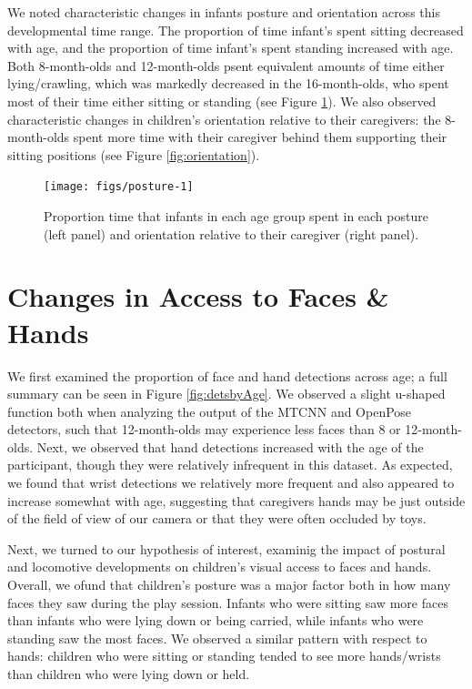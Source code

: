 \documentclass[10pt, letterpaper]{article}
\newenvironment{CodeChunk}{}{}
\begin{document}
We noted characteristic changes in infants posture and orientation
across this developmental time range. The proportion of time infant's
spent sitting decreased with age, and the proportion of time infant's
spent standing increased with age. Both 8-month-olds and 12-month-olds
psent equivalent amounts of time either lying/crawling, which was
markedly decreased in the 16-month-olds, who spent most of their time
either sitting or standing (see Figure \ref{fig:posture}). We also
observed characteristic changes in children's orientation relative to
their caregivers: the 8-month-olds spent more time with their caregiver
behind them supporting their sitting positions (see Figure
\ref{fig:orientation}).

\begin{CodeChunk}
\begin{figure}[h]

{\centering \texttt{[image: figs/posture-1]} 

}

\caption[Proportion time that infants in each age group spent in each posture (left panel) and orientation relative to their caregiver (right  panel)]{Proportion time that infants in each age group spent in each posture (left panel) and orientation relative to their caregiver (right  panel).}\label{fig:posture}
\end{figure}
\end{CodeChunk}

\section{Changes in Access to Faces \&
Hands}\label{changes-in-access-to-faces-hands}

We first examined the proportion of face and hand detections across age;
a full summary can be seen in Figure \ref{fig:detsbyAge}. We observed a
slight u-shaped function both when analyzing the output of the MTCNN and
OpenPose detectors, such that 12-month-olds may experience less faces
than 8 or 12-month-olds. Next, we observed that hand detections
increased with the age of the participant, though they were relatively
infrequent in this dataset. As expected, we found that wrist detections
we relatively more frequent and also appeared to increase somewhat with
age, suggesting that caregivers hands may be just outside of the field
of view of our camera or that they were often occluded by toys.

Next, we turned to our hypothesis of interest, examinig the impact of
postural and locomotive developments on children's visual access to
faces and hands. Overall, we ofund that children's posture was a major
factor both in how many faces they saw during the play session. Infants
who were sitting saw more faces than infants who were lying down or
being carried, while infants who were standing saw the most faces. We
observed a similar pattern with respect to hands: children who were
sitting or standing tended to see more hands/wrists than children who
were lying down or held.
\end{document}
